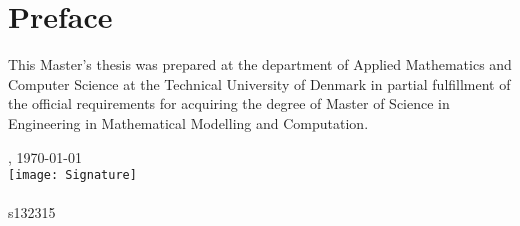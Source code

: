 
\chapter{Preface}
This Master's thesis was prepared at the department of Applied Mathematics and Computer Science at the Technical University of Denmark in partial fulfillment of the official requirements for acquiring the degree of Master of Science in Engineering in Mathematical Modelling and Computation.

\vfill

{
\centering
    \thesislocation{}, \today\\[2cm]
    \texttt{[image: Signature]}\\[0.7cm]
    \thesisauthor{}\\[2mm]
    s132315
\begin{flushright}
\end{flushright}
}